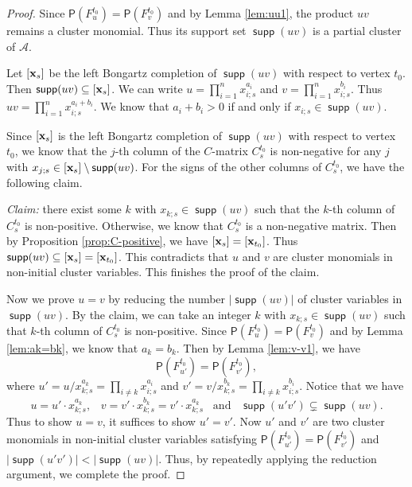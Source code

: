 \documentclass[10pt]{amsart}
\theoremstyle{definition}
\theoremstyle{remark}
\numberwithin{equation}{section}
\newcommand{\opname}[1]{\operatorname{\mathsf{#1}}}
\newcommand{\supp}{\opname{supp}}
\begin{document}
\begin{proof}
Since $\mathsf P(F_u^{t_0})=\mathsf P(F_{v}^{t_0})$ and by Lemma \ref{lem:uu1}, the product $uv$ remains a cluster monomial. Thus its support set $\supp(uv)$ is a partial cluster of $\mathcal A$.


Let $[{\bf x}_{s}]$ be the left Bongartz completion of $\supp(uv)$ with respect to vertex $t_0$. 
Then $\supp(uv)\subseteq [{\bf x}_s]$. We can write $u=\prod_{i=1}^nx_{i;s}^{a_i}$ and $v=\prod_{i=1}^nx_{i;s}^{b_i}$. Thus $uv=\prod_{i=1}^nx_{i;s}^{a_i+b_i}$. We know that $a_i+b_i>0$ if and only if $x_{i;s}\in\supp(uv)$. 


Since $[{\bf x}_{s}]$ is the left Bongartz completion of $\supp(uv)$ with respect to vertex $t_0$, 
we know that the $j$-th column of the $C$-matrix $C_s^{t_0}$ is non-negative for any $j$ with $x_{j;s}\in [{\bf x}_s]\setminus \supp(uv)$. For the signs of the other columns of $C_s^{t_0}$, we have the following claim.

{\em Claim:} there exist some $k$ with $x_{k;s}\in \supp(uv)$ such that the $k$-th column of $C_s^{t_0}$ is non-positive.
Otherwise, we know that $C_s^{t_0}$ is a non-negative matrix. Then by Proposition \ref{prop:C-positive}, we have $[{\bf x}_s]=[{\bf x}_{t_0}]$. Thus $\supp(uv)\subseteq [{\bf x}_s]=[{\bf x}_{t_0}]$. This contradicts that $u$ and $v$ are cluster monomials in non-initial cluster variables. This finishes the proof of the claim.


Now we prove $u=v$ by reducing the number $|\supp (uv)|$ of cluster variables in $\supp(uv)$.  By the claim, we can take an integer $k$
with $x_{k;s}\in\supp(uv)$ such that $k$-th column of $C_s^{t_0}$ is non-positive.
Since $\mathsf P(F_u^{t_0})=\mathsf P(F_{v}^{t_0})$ and by Lemma \ref{lem:ak=bk}, we know that $a_k=b_k$. 
Then by Lemma \ref{lem:v-v1}, we have
\[ \mathsf P(F_{u'}^{t_0})=\mathsf P(F_{v'}^{t_0}),\]
where $u'=u/x_{k;s}^{a_k}=\prod_{i\neq k}x_{i;s}^{a_i}$ and $v'=v/x_{k;s}^{b_k}=\prod_{i\neq k}x_{i;s}^{b_i}$.  Notice that we have 
\[ u=u'\cdot x_{k;s}^{a_k},\;\;\;v=v'\cdot x_{k;s}^{b_k}=v'\cdot x_{k;s}^{a_k}\;\;\;\text{and}\;\;\; \supp(u'v')\subsetneq \supp(uv).\]
Thus to show $u=v$, it suffices to show $u'=v'$. Now $u'$ and $v'$ are two cluster monomials in non-initial cluster variables satisfying $\mathsf P(F_{u'}^{t_0})=\mathsf P(F_{v'}^{t_0})$ and $|\supp(u'v')|< |\supp(uv)|$. Thus, by repeatedly applying the reduction argument, we complete the proof.
\end{proof}
\end{document}
